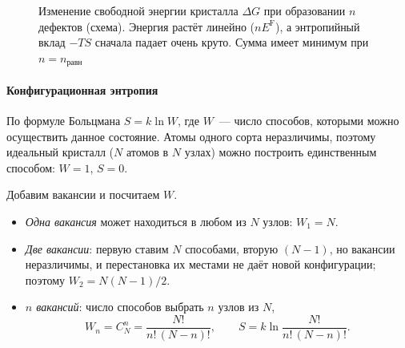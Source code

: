 \begin{figure}[ht]
\centering
{}
\caption{Изменение свободной энергии кристалла $\Delta G$ при образовании
$n$ дефектов (схема). Энергия растёт линейно ($nE^{\mathrm F}$), а
энтропийный вклад $-TS$ сначала падает очень круто. Сумма имеет минимум
при $n=n_{\text{равн}}$}
\label{fig:G-of-n}
\end{figure}

\paragraph{Конфигурационная энтропия}
По формуле Больцмана $S=k\ln W$, где $W$~— число способов, которыми можно
осуществить данное состояние. Атомы одного сорта неразличимы, поэтому
идеальный кристалл ($N$ атомов в $N$ узлах) можно построить единственным
способом: $W=1$, $S=0$.

Добавим вакансии и посчитаем $W$.
\begin{itemize}
\item \emph{Одна вакансия} может находиться в любом из $N$ узлов: $W_1=N$.
\item \emph{Две вакансии}: первую ставим $N$ способами, вторую $(N-1)$,
но вакансии неразличимы, и перестановка их местами не даёт новой
конфигурации; поэтому $W_2=N(N-1)/2$.
\item \emph{$n$ вакансий}: число способов выбрать $n$ узлов из $N$,
\begin{equation}\label{eq:Wn}
W_n=C_N^n=\frac{N!}{n!\,(N-n)!},\qquad S=k\ln\frac{N!}{n!\,(N-n)!}.
\end{equation}
\end{itemize}

